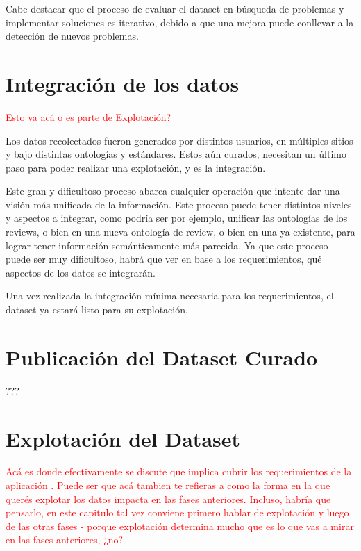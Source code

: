 Cabe destacar que el proceso de evaluar el dataset en búsqueda de problemas y implementar soluciones es iterativo, debido a que 
una mejora puede conllevar a la detección de nuevos problemas.

%

\section{Integración de los datos}
\begin{framed}
\textcolor{red}{Esto va acá o es parte de Explotación?}
\end{framed}


Los datos recolectados fueron generados por distintos usuarios, en múltiples sitios y bajo distintas ontologías y estándares.
Estos aún curados, necesitan un último paso para poder realizar una explotación, y es la integración.

Este gran y dificultoso proceso abarca cualquier operación que intente dar una visión más unificada de la información. Este
proceso puede tener distintos niveles y aspectos a integrar, como podría ser por ejemplo, unificar las ontologías de los reviews, o bien
en una nueva ontología de review, o bien en una ya existente, para lograr tener información semánticamente más parecida. Ya 
que este proceso puede ser muy dificultoso, habrá que ver en base a los requerimientos, qué aspectos de los datos se integrarán.

Una vez realizada la integración mínima necesaria para los requerimientos, el dataset ya estará listo para su explotación.

\section{Publicación del Dataset Curado}
???

\section{Explotación del Dataset}
\begin{framed}
\textcolor{red}{Acá es donde efectivamente se discute que implica cubrir los requerimientos de la aplicación . Puede ser que acá tambien te refieras a como la forma en la que querés explotar los datos impacta en las fases anteriores. Incluso, habría que pensarlo, en este capitulo tal vez conviene primero hablar de explotación y luego de las otras fases - porque explotación determina mucho que es lo que vas a mirar en las fases anteriores, ¿no?}
\end{framed}


